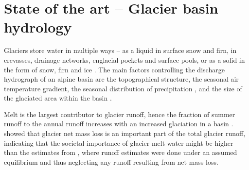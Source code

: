 \documentclass[12pt, a4paper]{article}
\begin{document}
\section{State of the art -- Glacier basin hydrology}
Glaciers store water in multiple ways -- as a liquid in surface snow and firn,
in crevasses, drainage networks, englacial pockets and surface pools, or as a
solid in the form of snow, firn and ice
\parencite{janssonConceptGlacierStorage2003}. The main factors controlling the
discharge hydrograph of an alpine basin are the topographical structure, the
seasonal air temperature gradient, the seasonal distribution of precipitation
\parencite{zappaSeasonalWaterBalance2003}, and the size of the glaciated area
within the basin \parencite{janssonConceptGlacierStorage2003}. 

Melt is the largest contributor to glacier runoff, hence the fraction of summer
runoff to the annual runoff increases with an increased glaciation in a basin
\parencite{zappaSeasonalWaterBalance2003,chenInfluenceAlpineGlaciers1990}.
\textcite{blissGlobalResponseGlacier2014} showed that glacier net
mass loss is an important part of the total glacier runoff, indicating that the
societal importance of glacier melt water might be higher than the estimates
from \textcite{kaserContributionPotentialGlaciers2010}, where runoff estimates
were done under an assumed equilibrium and thus neglecting any runoff resulting
from net mass loss.


\end{document}
